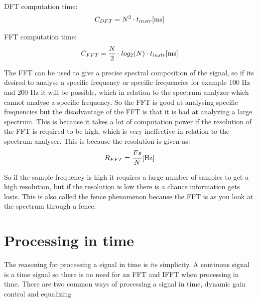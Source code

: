 DFT computation time:
\begin{equation}
C_{DFT} = N^{2}\cdot t_{instr} \enhed{ms}
\end{equation}
\begin{where}
\end{where}

FFT computation time:
\begin{equation}
C_{FFT} = \frac{N}{2}\cdot log_{2}(N)\cdot t_{instr} \enhed{ms}
\end{equation}
\begin{where}
\end{where}

The FFT can be used to give a precise spectral composition of the signal, so if its desired to analyse a specific frequency or specific frequencies for example 100 Hz and 200 Hz it will be possible, which in relation to the spectrum analyzer which cannot analyse a specific frequency. So the FFT is good at analysing specific frequencies but the disadvantage of the FFT is that it is bad at analyzing a large spectrum. This is because it takes a lot of computation power if the resolution of the FFT is required to be high, which is very ineffective in relation to the spectrum analyser. This is because the resolution is given as:
\begin{equation}
R_{FFT} = \frac{Fs}{N} \enhed{Hz}
\end{equation}
\begin{where}
\end{where} 

So if the sample frequency is high it requires a large number of samples to get a high resolution, but if the resolution is low there is a chance information gets losts. This is also called the fence phenomenon because the FFT is as you look at the spectrum through a fence. 









\section{Processing in time}
The reasoning for processing a signal in time is its simplicity. A continous signal is a time signal so there is no need for an FFT and IFFT when processing in time. There are two common ways of processing a signal in time, dynamic gain control and equalizing  


